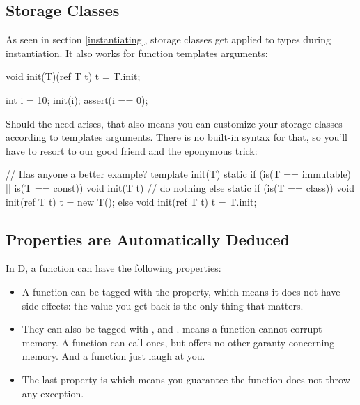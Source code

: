 
\subsection{Storage Classes}\label{storageclasses}

As seen in section \ref{instantiating}, storage classes get applied to types during instantiation. It also works for function templates arguments:

\begin{dcode}
void init(T)(ref T t)
{ 
    t = T.init;
}

int i = 10;
init(i);
assert(i == 0);
\end{dcode}

Should the need arises, that also means you can customize your storage classes according to templates arguments. There is no built-in syntax for that, so you'll have to resort to our good friend  and the eponymous trick:

\begin{dcode}
// Has anyone a better example?
template init(T)
{
    static if (is(T == immutable) || is(T == const))
        void init(T t) {} // do nothing
    else static if (is(T == class))
        void init(ref T t)
        {
            t = new T();
        }
    else 
        void init(ref T t)
        {
            t = T.init;
        }
}
\end{dcode}

\subsection{Properties are Automatically Deduced}\label{autodeduce}

In D, a function can have the following properties:

\begin{itemize}
\item A function can be tagged with the  property, which means it does not have side-effects: the value you get back is the only thing that matters. 
\item They can also be tagged with ,  and .  means a function cannot corrupt memory. A  function can call  ones, but offers no other garanty concerning memory. And a  function just laugh at you.
\item The last property is  which means you guarantee the function does not throw any exception.
\end{itemize}

